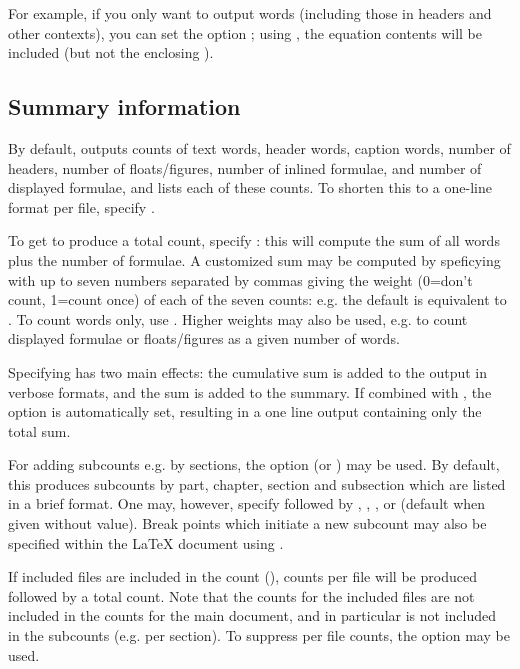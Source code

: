 \documentclass{article}
\begin{document}
For example, if you only want to output words (including those in headers and other contexts), you can set the option ; using , the equation contents will be included (but not the enclosing \code{\$\ldots\$}).


\subsection{Summary information}

By default, \TeXcount{} outputs counts of text words, header words, caption words, number of headers, number of floats/figures, number of inlined formulae, and number of displayed formulae, and lists each of these counts. To shorten this to a one-line format per file, specify .

To get \TeXcount{} to produce a total count, specify : this will compute the sum of all words plus the number of formulae. A customized sum may be computed by speficying  with up to seven numbers separated by commas giving the weight (0=don't count, 1=count once) of each of the seven counts: e.g. the default is equivalent to . To count words only, use . Higher weights may also be used, e.g. to count displayed formulae or floats/figures as a given number of words.

Specifying  has two main effects: the cumulative sum is added to the output in verbose formats, and the sum is added to the summary. If combined with , the option  is automatically set, resulting in a one line output containing only the total sum.

For adding subcounts e.g. by sections, the option  (or ) may be used. By default, this produces subcounts by part, chapter, section and subsection which are listed in a brief format. One may, however, specify  followed by , , , or  (default when given without value). Break points which initiate a new subcount may also be specified within the \LaTeX{} document using .

If included files are included in the count (), counts per file will be produced followed by a total count. Note that the counts for the included files are not included in the counts for the main document, and in particular is not included in the subcounts (e.g. per section). To suppress per file counts, the option  may be used.
\end{document}
